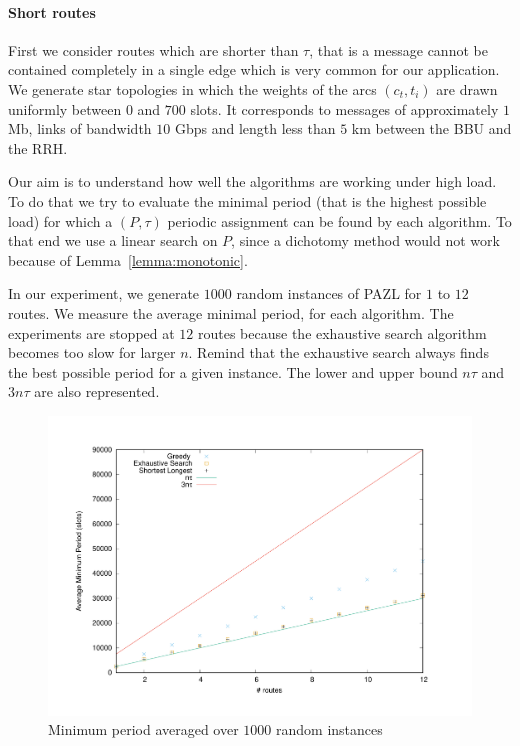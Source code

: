 \documentclass[a4paper,10pt]{article}
\begin{document}
      \paragraph{Short routes}
      
      First we consider routes which are shorter than $\tau$, that is a message cannot be contained 
      completely in a single edge which is very common for our application. We generate star topologies in which the weights of the arcs $(c_t,t_i)$ are drawn uniformly between $0$ and $700$ slots. It corresponds to messages of approximately $1$ Mb, links of bandwidth $10$ Gbps and length less than $5$ km between the BBU and the RRH. 
      
      Our aim is to understand how well the algorithms are working under high load. To do that we try to evaluate the 
      minimal period (that is the highest possible load) for which a $(P,\tau)$ periodic assignment can be found by each algorithm. 
      To that end we use a linear search on $P$, since a dichotomy method would not work because of Lemma~\ref{lemma:monotonic}.
      
      In our experiment, we generate $1000$ random instances of PAZL for $1$ to $12$ routes. 
      We measure the average minimal period, for each algorithm. The experiments are stopped at $12$ routes because the exhaustive search algorithm becomes too slow for larger $n$. Remind that the exhaustive search always finds the best possible period for a given instance. The lower and upper bound $n\tau$ and $3n\tau$ are also represented.
      
      
        
      \begin{figure}

      \begin{center}
	\includegraphics[scale=0.4]{periode_petite.pdf}
      \end{center}
      \caption{Minimum period averaged over $1000$ random instances}
      \end{figure}
      
\end{document}
